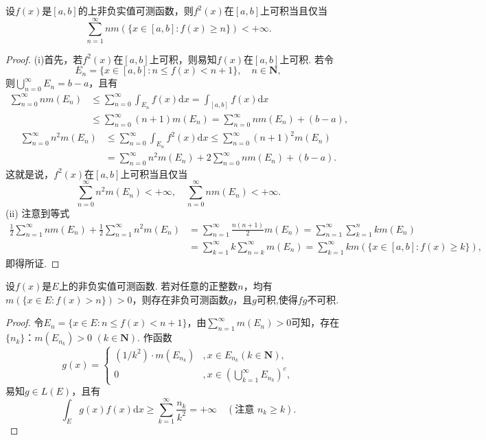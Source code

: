 \documentclass[../../main.tex]{subfiles}
\begin{document}
\begin{example}
设\(f(x)\)是\([a, b]\)的上非负实值可测函数，则\(f^2(x)\)在\([a, b]\)上可积当且仅当
\[
\sum_{n = 1}^{\infty} n m(\{x \in [a, b]: f(x) \geqslant n\}) < +\infty.
\]
\end{example}
\begin{proof}
(i)首先，若\(f^2(x)\)在\([a, b]\)上可积，则易知\(f(x)\)在\([a, b]\)上可积. 若令
\[
E_n = \{x \in [a, b]: n \leqslant f(x) < n + 1\}, \quad n \in \mathbf{N},
\]
则\(\bigcup_{n = 0}^{\infty} E_n = b - a\)，且有
\begin{align*}
\sum_{n = 0}^{\infty} n m(E_n) &\leqslant \sum_{n = 0}^{\infty} \int_{E_n} f(x) \mathrm{d}x = \int_{[a, b]} f(x) \mathrm{d}x \\
&\leqslant \sum_{n = 0}^{\infty} (n + 1)m(E_n) = \sum_{n = 0}^{\infty} n m(E_n) + (b - a),
\end{align*}
\begin{align*}
\sum_{n = 0}^{\infty} n^2 m(E_n) &\leqslant \sum_{n = 0}^{\infty} \int_{E_n} f^2(x) \mathrm{d}x \leqslant \sum_{n = 0}^{\infty} (n + 1)^2 m(E_n) \\
&= \sum_{n = 0}^{\infty} n^2 m(E_n) + 2 \sum_{n = 0}^{\infty} n m(E_n) + (b - a).
\end{align*}
这就是说，\(f^2(x)\)在\([a, b]\)上可积当且仅当
\[
\sum_{n = 0}^{\infty} n^2 m(E_n) < +\infty, \quad \sum_{n = 0}^{\infty} n m(E_n) < +\infty.
\]
(ii) 注意到等式
\begin{align*}
\frac{1}{2} \sum_{n = 1}^{\infty} n m(E_n) + \frac{1}{2} \sum_{n = 1}^{\infty} n^2 m(E_n) 
&= \sum_{n = 1}^{\infty} \frac{n(n + 1)}{2} m(E_n) = \sum_{n = 1}^{\infty} \sum_{k = 1}^{n} k m(E_n) \\
&= \sum_{k = 1}^{\infty} k \sum_{n = k}^{\infty} m(E_n) = \sum_{k = 1}^{\infty} k m(\{x \in [a, b]: f(x) \geqslant k\}),
\end{align*}
即得所证.

\end{proof}

\begin{proposition}\label{proposition:4.1例7}
设\(f(x)\)是\(E\)上的非负实值可测函数. 若对任意的正整数\(n\)，均有\(m(\{x \in E: f(x)>n\})>0\)，则存在非负可测函数\(g\)，且$g$可积,使得\(fg\)不可积.
\end{proposition}
\begin{proof}
令\(E_n = \{x \in E: n \leqslant f(x) < n + 1\}\)，由\(\sum_{n = 1}^{\infty} m(E_n) > 0\)可知，存在\(\{n_k\}\)：\(m(E_{n_k})>0\) \((k \in \mathbf{N})\). 作函数
\[
g(x)=
\begin{cases}
(1 / k^2) \cdot m(E_{n_k}) &, x \in E_{n_k} (k \in \mathbf{N}), \\
0 & ,x \in \left(\bigcup_{k = 1}^{\infty} E_{n_k}\right)^c,
\end{cases}
\]
易知\(g \in L(E)\)，且有
\[
\int_E g(x) f(x) \mathrm{d}x \geqslant \sum_{k = 1}^{\infty} \frac{n_k}{k^2} = +\infty \quad (\text{注意 } n_k \geqslant k).
\] 

\end{proof}
\end{document}
